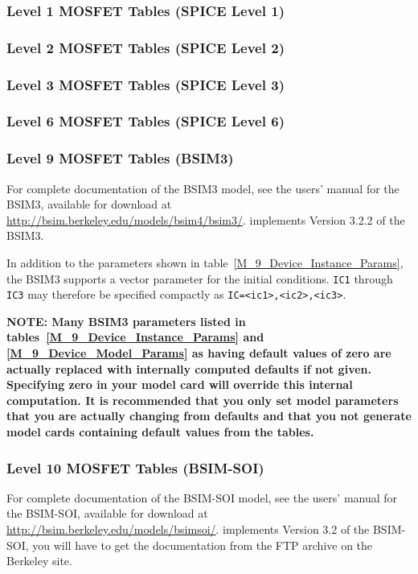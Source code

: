 \clearpage
\subsubsection{Level 1 MOSFET Tables (SPICE Level 1)}


\clearpage
\subsubsection{Level 2 MOSFET Tables (SPICE Level 2)}


\clearpage
\subsubsection{Level 3 MOSFET Tables (SPICE Level 3)}


\clearpage
\subsubsection{Level 6 MOSFET Tables (SPICE Level 6)}


\clearpage
\subsubsection{Level 9 MOSFET Tables (BSIM3)}
For complete documentation of the BSIM3 model, see the users' manual for
the BSIM3, available for download at
\url{http://bsim.berkeley.edu/models/bsim4/bsim3/}.
\Xyce{} implements Version 3.2.2 of the BSIM3.

In addition to the parameters shown in
table~\ref{M_9_Device_Instance_Params}, the BSIM3 supports a vector
parameter for the initial conditions.  \texttt{IC1} through
\texttt{IC3} may therefore be specified compactly as
\texttt{IC=<ic1>,<ic2>,<ic3>}.

\textbf{NOTE:  Many BSIM3 parameters listed in
tables~\ref{M_9_Device_Instance_Params} and \ref{M_9_Device_Model_Params} as
having default values of zero are actually replaced with internally computed
defaults if not given.  Specifying zero in your model card will override this
internal computation.  It is recommended that you only set model parameters
that you are actually changing from defaults and that you not generate model
cards containing default values from the tables.}



\clearpage
\subsubsection{Level 10 MOSFET Tables (BSIM-SOI)}
For complete documentation of the BSIM-SOI model, see the users' manual
for the BSIM-SOI, available for download at
\url{http://bsim.berkeley.edu/models/bsimsoi/}.
\Xyce{} implements Version 3.2 of the BSIM-SOI, you will have to get the
documentation from the FTP archive on the Berkeley site.

